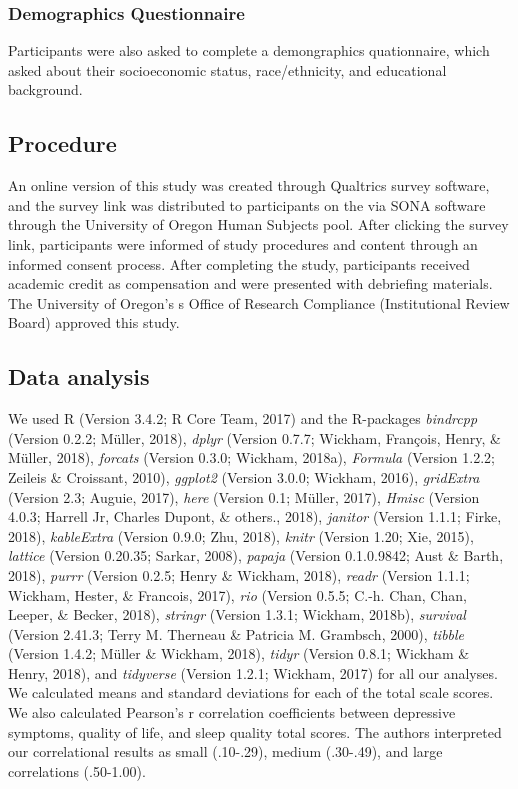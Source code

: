 \documentclass[man]{apa6}
\theoremstyle{definition}
\theoremstyle{definition}
\theoremstyle{definition}
\theoremstyle{remark}
\begin{document}
\subsubsection{Demographics
Questionnaire}\label{demographics-questionnaire}

Participants were also asked to complete a demongraphics quationnaire,
which asked about their socioeconomic status, race/ethnicity, and
educational background.

\subsection{Procedure}\label{procedure}

An online version of this study was created through Qualtrics survey
software, and the survey link was distributed to participants on the via
SONA software through the University of Oregon Human Subjects pool.
After clicking the survey link, participants were informed of study
procedures and content through an informed consent process. After
completing the study, participants received academic credit as
compensation and were presented with debriefing materials. The
University of Oregon's s Office of Research Compliance (Institutional
Review Board) approved this study.

\subsection{Data analysis}\label{data-analysis}

We used R (Version 3.4.2; R Core Team, 2017) and the R-packages
\emph{bindrcpp} (Version 0.2.2; Müller, 2018), \emph{dplyr} (Version
0.7.7; Wickham, François, Henry, \& Müller, 2018), \emph{forcats}
(Version 0.3.0; Wickham, 2018a), \emph{Formula} (Version 1.2.2; Zeileis
\& Croissant, 2010), \emph{ggplot2} (Version 3.0.0; Wickham, 2016),
\emph{gridExtra} (Version 2.3; Auguie, 2017), \emph{here} (Version 0.1;
Müller, 2017), \emph{Hmisc} (Version 4.0.3; Harrell Jr, Charles Dupont,
\& others., 2018), \emph{janitor} (Version 1.1.1; Firke, 2018),
\emph{kableExtra} (Version 0.9.0; Zhu, 2018), \emph{knitr} (Version
1.20; Xie, 2015), \emph{lattice} (Version 0.20.35; Sarkar, 2008),
\emph{papaja} (Version 0.1.0.9842; Aust \& Barth, 2018), \emph{purrr}
(Version 0.2.5; Henry \& Wickham, 2018), \emph{readr} (Version 1.1.1;
Wickham, Hester, \& Francois, 2017), \emph{rio} (Version 0.5.5; C.-h.
Chan, Chan, Leeper, \& Becker, 2018), \emph{stringr} (Version 1.3.1;
Wickham, 2018b), \emph{survival} (Version 2.41.3; Terry M. Therneau \&
Patricia M. Grambsch, 2000), \emph{tibble} (Version 1.4.2; Müller \&
Wickham, 2018), \emph{tidyr} (Version 0.8.1; Wickham \& Henry, 2018),
and \emph{tidyverse} (Version 1.2.1; Wickham, 2017) for all our
analyses. We calculated means and standard deviations for each of the
total scale scores. We also calculated Pearson's r correlation
coefficients between depressive symptoms, quality of life, and sleep
quality total scores. The authors interpreted our correlational results
as small (.10-.29), medium (.30-.49), and large correlations (.50-1.00).
\end{document}
